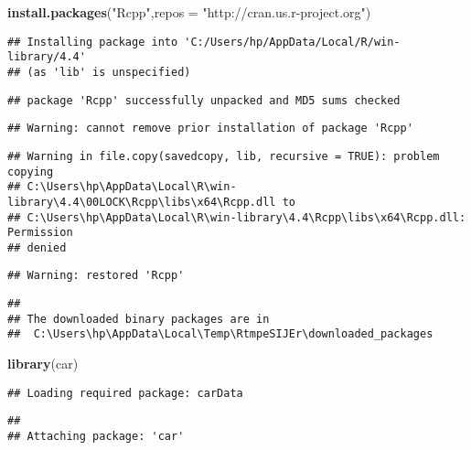 \documentclass[
]{article}
\newenvironment{Shaded}{\begin{snugshade}}{\end{snugshade}}
\newcommand{\AttributeTok}[1]{\textcolor[rgb]{0.13,0.29,0.53}{#1}}
\newcommand{\FunctionTok}[1]{\textcolor[rgb]{0.13,0.29,0.53}{\textbf{#1}}}
\newcommand{\NormalTok}[1]{#1}
\newcommand{\StringTok}[1]{\textcolor[rgb]{0.31,0.60,0.02}{#1}}
\begin{document}
\begin{Shaded}
\begin{Highlighting}[]
\FunctionTok{install.packages}\NormalTok{(}\StringTok{"Rcpp"}\NormalTok{,}\AttributeTok{repos =} \StringTok{"http://cran.us.r{-}project.org"}\NormalTok{)}
\end{Highlighting}
\end{Shaded}

\begin{verbatim}
## Installing package into 'C:/Users/hp/AppData/Local/R/win-library/4.4'
## (as 'lib' is unspecified)
\end{verbatim}

\begin{verbatim}
## package 'Rcpp' successfully unpacked and MD5 sums checked
\end{verbatim}

\begin{verbatim}
## Warning: cannot remove prior installation of package 'Rcpp'
\end{verbatim}

\begin{verbatim}
## Warning in file.copy(savedcopy, lib, recursive = TRUE): problem copying
## C:\Users\hp\AppData\Local\R\win-library\4.4\00LOCK\Rcpp\libs\x64\Rcpp.dll to
## C:\Users\hp\AppData\Local\R\win-library\4.4\Rcpp\libs\x64\Rcpp.dll: Permission
## denied
\end{verbatim}

\begin{verbatim}
## Warning: restored 'Rcpp'
\end{verbatim}

\begin{verbatim}
## 
## The downloaded binary packages are in
##  C:\Users\hp\AppData\Local\Temp\RtmpeSIJEr\downloaded_packages
\end{verbatim}

\begin{Shaded}
\begin{Highlighting}[]
\FunctionTok{library}\NormalTok{(car)}
\end{Highlighting}
\end{Shaded}

\begin{verbatim}
## Loading required package: carData
\end{verbatim}

\begin{verbatim}
## 
## Attaching package: 'car'
\end{verbatim}
\end{document}
